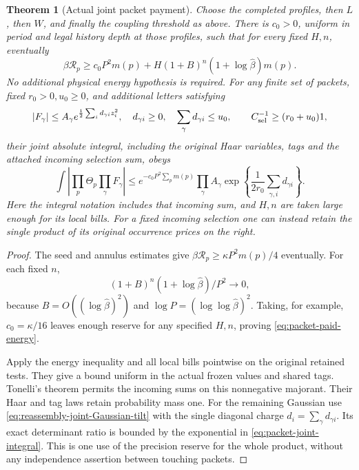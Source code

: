\documentclass[11pt,reqno]{amsart}
\numberwithin{equation}{section}
\newtheorem{theorem}{Theorem}[section]
\theoremstyle{definition}
\theoremstyle{remark}
\begin{document}
\begin{theorem}[Actual joint packet payment]
\label{thm:packet-joint-payment}
Choose the completed profiles, then \(L\), then \(W\), and
finally the coupling threshold as above. There is \(c_0>0\),
uniform in period and legal history depth at those profiles,
such that for every fixed \(H,n\), eventually
\begin{equation}
 \beta\mathcal R_p\ge c_0P^2m(p)
                +H(1+B)^n(1+\log\widehat\beta)m(p).
 \label{eq:packet-paid-energy}
\end{equation}
No additional physical energy hypothesis is required.
For any finite set of packets, fixed \(r_0>0,u_0\ge0\), and
additional letters satisfying
\[
 |F_\gamma|\le A_\gamma
          e^{\frac12\sum_i d_{\gamma i}z_i^2},\quad
 d_{\gamma i}\ge0,\quad \sum_\gamma d_{\gamma i}\le u_0,
 \qquad C_{\rm sel}^{-1}\ge(r_0+u_0)1,
\]
their joint absolute integral, including the original Haar
variables, tags and the attached incoming selection sum, obeys
\begin{equation}
 \int\left|\prod_p\Theta_p\prod_\gamma F_\gamma\right|
 \le e^{-c_0P^2\sum_p m(p)}\prod_\gamma A_\gamma
        \exp\!\left\{\frac1{2r_0}\sum_{\gamma,i}d_{\gamma i}\right\}.
 \label{eq:packet-joint-integral}
\end{equation}
Here the integral notation includes that incoming sum, and
\(H,n\) are taken large enough for its local bills.
For a fixed incoming selection one can instead retain the
single product of its original occurrence prices on the right.
\end{theorem}
\begin{proof}
The seed and annulus estimates give
\(\beta\mathcal R_p\ge\kappa P^2m(p)/4\) eventually.
For each fixed \(n\),
\[
            (1+B)^n(1+\log\widehat\beta)/P^2\longrightarrow0,
\]
because \(B=O((\log\widehat\beta)^2)\) and
\(\log P=(\log\log\widehat\beta)^2\).
Taking, for example, \(c_0=\kappa/16\) leaves enough
reserve for any specified \(H,n\), proving
\eqref{eq:packet-paid-energy}.

Apply the energy inequality and all local bills pointwise on
the original retained tests. They give a bound uniform in the
actual frozen values and shared tags. Tonelli's theorem permits
the incoming sums on this nonnegative majorant. Their Haar and
tag laws retain probability mass one.
For the remaining Gaussian use
\eqref{eq:reassembly-joint-Gaussian-tilt} with the single
diagonal charge \(d_i=\sum_\gamma d_{\gamma i}\).
Its exact determinant ratio is bounded by the exponential in
\eqref{eq:packet-joint-integral}. This is one use of the
precision reserve for the whole product, without any
independence assertion between touching packets.
\end{proof}
\end{document}
